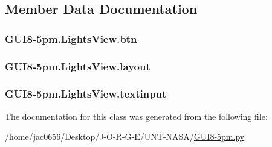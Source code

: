 \subsection{Member Data Documentation}
\subsubsection[{\texorpdfstring{btn}{btn}}]{\setlength{\rightskip}{0pt plus 5cm}G\+U\+I8-\/5pm.\+Lights\+View.\+btn}\hypertarget{classGUI8-5pm_1_1LightsView_a28bbef7d59d31653b776afd6fcccced6}{}\label{classGUI8-5pm_1_1LightsView_a28bbef7d59d31653b776afd6fcccced6}
\subsubsection[{\texorpdfstring{layout}{layout}}]{\setlength{\rightskip}{0pt plus 5cm}G\+U\+I8-\/5pm.\+Lights\+View.\+layout}\hypertarget{classGUI8-5pm_1_1LightsView_a278c241514a229adb33b8060ef39add5}{}\label{classGUI8-5pm_1_1LightsView_a278c241514a229adb33b8060ef39add5}
\subsubsection[{\texorpdfstring{textinput}{textinput}}]{\setlength{\rightskip}{0pt plus 5cm}G\+U\+I8-\/5pm.\+Lights\+View.\+textinput}\hypertarget{classGUI8-5pm_1_1LightsView_a4c5fd6f57291537df95d11cf96507abb}{}\label{classGUI8-5pm_1_1LightsView_a4c5fd6f57291537df95d11cf96507abb}


The documentation for this class was generated from the following file\+:\begin{DoxyCompactItemize}
\item 
/home/jac0656/\+Desktop/\+J-\/\+O-\/\+R-\/\+G-\/\+E/\+U\+N\+T-\/\+N\+A\+S\+A/\hyperlink{GUI8-5pm_8py}{G\+U\+I8-\/5pm.\+py}\end{DoxyCompactItemize}
